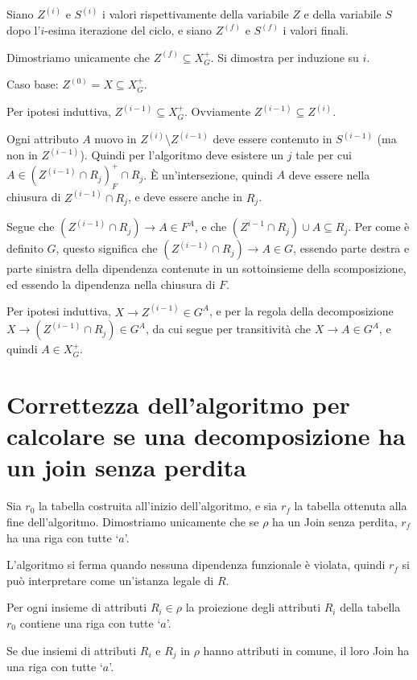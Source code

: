 Siano $Z^{(i)}$ e $S^{(i)}$ i valori rispettivamente della variabile $Z$ e della variabile $S$ dopo l'$i$-esima iterazione del ciclo, e siano $Z^{(f)}$ e $S^{(f)}$ i valori finali.

Dimostriamo unicamente che $Z^{(f)} \subseteq X^+_G$. Si dimostra per induzione su $i$.

Caso base: $Z^{(0)} = X \subseteq X^+_G$.

Per ipotesi induttiva, $Z^{(i-1)} \subseteq X^+_G$. Ovviamente $Z^{(i-1)} \subseteq Z^{(i)}$.

Ogni attributo $A$ nuovo in $Z^{(i)} \setminus Z^{(i-1)}$ deve essere contenuto in $S^{(i-1)}$ (ma non in $Z^{(i-1)}$). Quindi per l'algoritmo deve esistere un $j$ tale per cui $A \in (Z^{(i-1)} \cap R_j)^+_F \cap R_j$. \`E un'intersezione, quindi $A$ deve essere nella chiusura di $Z^{(i-1)} \cap R_j$, e deve essere anche in $R_j$.

Segue che $(Z^{(i-1)} \cap R_j) \to A \in F^A$, e che $(Z^{i-1} \cap R_j) \cup A \subseteq R_j$. Per come \`e definito $G$, questo significa che $(Z^{(i-1)} \cap R_j) \to A \in G$, essendo parte destra e parte sinistra della dipendenza contenute in un sottoinsieme della scomposizione, ed essendo la dipendenza nella chiusura di $F$.

Per ipotesi induttiva, $X \to Z^{(i-1)} \in G^A$, e per la regola della decomposizione $X \to (Z^{(i-1)} \cap R_j) \in G^A$, da cui segue per transitivit\`a che $X \to A \in G^A$, e quindi $A \in X^+_G$.

\section{Correttezza dell'algoritmo per calcolare se una decomposizione ha un join senza perdita}

Sia $r_0$ la tabella costruita all'inizio dell'algoritmo, e sia $r_f$ la tabella ottenuta alla fine dell'algoritmo. Dimostriamo unicamente che se $\rho$ ha un Join senza perdita, $r_f$ ha una riga con tutte `$a$'.

L'algoritmo si ferma quando nessuna dipendenza funzionale \`e violata, quindi $r_f$ si pu\`o interpretare come un'istanza legale di $R$.

Per ogni insieme di attributi $R_i \in \rho$ la proiezione degli attributi $R_i$ della tabella $r_0$ contiene una riga con tutte `$a$'.

Se due insiemi di attributi $R_i$ e $R_j$ in $\rho$ hanno attributi in comune, il loro Join ha una riga con tutte `$a$'.

